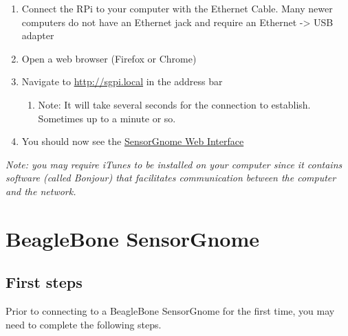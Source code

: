 \documentclass[
]{book}
\providecommand{\tightlist}{%
  \setlength{\itemsep}{0pt}\setlength{\parskip}{0pt}}
\begin{document}
\begin{enumerate}
\def\labelenumi{\arabic{enumi}.}
\item
  Connect the RPi to your computer with the Ethernet Cable. Many newer computers do not have an Ethernet jack and require an Ethernet -\textgreater{} USB adapter
\item
  Open a web browser (Firefox or Chrome)
\item
  Navigate to \url{http://sgpi.local} in the address bar

  \begin{enumerate}
  \def\labelenumii{\alph{enumii})}
  \tightlist
  \item
    Note: It will take several seconds for the connection to establish. Sometimes up to a minute or so.
  \end{enumerate}
\item
  You should now see the \protect\hyperlink{webinterface}{SensorGnome Web Interface}
\end{enumerate}

\emph{Note: you may require iTunes to be installed on your computer since it contains software (called Bonjour) that facilitates communication between the computer and the network.}

\hypertarget{beaglebone-sensorgnome}{%
\section{BeagleBone SensorGnome}\label{beaglebone-sensorgnome}}

\hypertarget{first-steps}{%
\subsection{First steps}\label{first-steps}}

Prior to connecting to a BeagleBone SensorGnome for the first time, you may need to complete the following steps.
\end{document}
